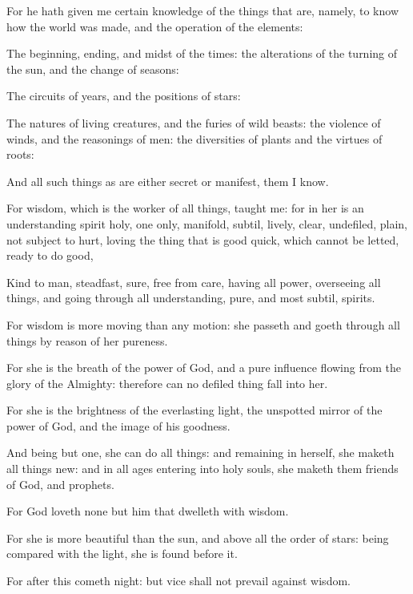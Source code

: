 {\par }{\PP {}For he hath given me certain knowledge of the things that are, namely, to know how the world was made, and the operation of the elements:
\par }{\PP {}The beginning, ending, and midst of the times: the alterations of the turning of the sun, and the change of seasons:
\par }{\PP {}The circuits of years, and the positions of stars:
\par }{\PP {}The natures of living creatures, and the furies of wild beasts: the violence of winds, and the reasonings of men: the diversities of plants and the virtues of roots:
\par }{\PP {}And all such things as are either secret or manifest, them I know.
\par }{\PP {}For wisdom, which is the worker of all things, taught me: for in her is an understanding spirit holy, one only, manifold, subtil, lively, clear, undefiled, plain, not subject to hurt, loving the thing that is good quick, which cannot be letted, ready to do good,
\par }{\PP {}Kind to man, steadfast, sure, free from care, having all power, overseeing all things, and going through all understanding, pure, and most subtil, spirits.
\par }{\PP {}For wisdom is more moving than any motion: she passeth and goeth through all things by reason of her pureness.
\par }{\PP {}For she is the breath of the power of God, and a pure influence flowing from the glory of the Almighty: therefore can no defiled thing fall into her.
\par }{\PP {}For she is the brightness of the everlasting light, the unspotted mirror of the power of God, and the image of his goodness.
\par }{\PP {}And being but one, she can do all things: and remaining in herself, she maketh all things new: and in all ages entering into holy souls, she maketh them friends of God, and prophets.
\par }{\PP {}For God loveth none but him that dwelleth with wisdom.
\par }{\PP {}For she is more beautiful than the sun, and above all the order of stars: being compared with the light, she is found before it.
\par }{\PP {}For after this cometh night: but vice shall not prevail against wisdom.

}
